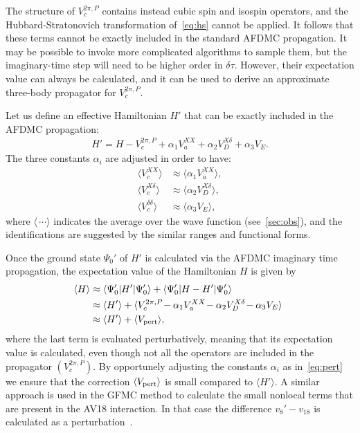 \documentclass[aps,prc,twocolumn,superscriptaddress,floatfix]{revtex4-1}
\begin{document}
The structure of $V_c^{2\pi,P}$ contains instead cubic spin and isospin operators, 
and the Hubbard-Stratonovich transformation of~\cref{eq:hs} cannot be applied.
It follows that these terms cannot be exactly included in the standard AFDMC propagation.
It may be possible to invoke more complicated algorithms to sample them, 
but the imaginary-time step will need to be higher order in $\delta\tau$.
However, their expectation value can always be calculated, and it can be used to derive
an approximate three-body propagator for $V_c^{2\pi,P}$.

Let us define an effective Hamiltonian $H'$ that can be exactly included in 
the AFDMC propagation:
\begin{align}
H'=H-V_c^{2\pi,P}+\alpha_1 V_a^{XX}+\alpha_2 V_D^{X\delta}+\alpha_3 V_E .
\label{eq:h'}
\end{align}
The three constants $\alpha_i$ are adjusted in order to have:
\begin{align}
\langle V_c^{XX}\rangle & \approx\langle\alpha_1 V_a^{XX}\rangle , \nonumber \\
\langle V_c^{X\delta}\rangle & \approx\langle\alpha_2 V_D^{X\delta}\rangle , \nonumber  \\
\langle V_c^{\delta\delta}\rangle & \approx\langle\alpha_3 V_E\rangle , 
\label{eq:pert}
\end{align}
where $\langle\,\cdots\rangle$ indicates the average over the wave function
(see~\cref{sec:obs}), and the identifications are suggested by the similar 
ranges and functional forms.

Once the ground state $\Psi_0'$ of $H'$ is calculated via the AFDMC imaginary
time propagation, the expectation value of the Hamiltonian $H$ is given by
\begin{align}
\!\!\langle H\rangle &\approx\langle\Psi_0'|H'|\Psi_0'\rangle+\langle\Psi_0'|H-H'|\Psi_0'\rangle \nonumber \\
& \approx\langle H'\rangle+\langle V_c^{2\pi,P}\!-\alpha_1V_a^{XX}\!-\alpha_2V_D^{X\delta}\!-\alpha_3V_E\rangle \nonumber \\
& \approx\langle H'\rangle+\langle V_{\rm pert}\rangle ,
\label{eq:<h3b>}
\end{align}
where the last term is evaluated perturbatively, meaning that its expectation
value is calculated, even though not all the operators are included in the propagator $(V_c^{2\pi,P})$.
By opportunely adjusting the constants $\alpha_i$ as in~\cref{eq:pert} we ensure that
the correction $\langle V_{\rm pert}\rangle$ is small compared to $\langle H'\rangle$.
A similar approach is used in the GFMC method to calculate the small nonlocal terms that are 
present in the AV18 interaction. In that case the difference $v_8'-v_{18}$
is calculated as a perturbation~\cite{Pudliner:1997}.
\end{document}

